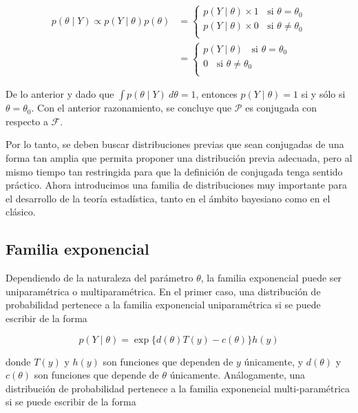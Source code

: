 \documentclass[
  10pt,
  spanish,
]{book}
\theoremstyle{definition}
\theoremstyle{definition}
\theoremstyle{definition}
\theoremstyle{definition}
\theoremstyle{remark}
\begin{document}
\begin{align*}
    p(\theta \mid Y)\propto
    p(Y \mid \theta)p(\theta)
    &=
    \begin{cases}
    p(Y \mid \theta)\times 1 \ \ \ \ \text{si $\theta=\theta_0$}\\
    p(Y \mid \theta)\times 0 \ \ \ \ \text{si $\theta\neq\theta_0$}\\
    \end{cases}\\
    &=
    \begin{cases}
    p(Y \mid \theta) \ \ \ \ \text{si $\theta=\theta_0$}\\
    0           \ \ \ \ \text{si $\theta\neq\theta_0$}\\
    \end{cases}
\end{align*}

De lo anterior y dado que \(\int p(\theta \mid Y)\ d\theta=1\), entonces
\(p(Y \mid \theta)=1\) si y sólo si \(\theta=\theta_0\). Con el anterior
razonamiento, se concluye que \(\mathcal{P}\) es conjugada con respecto a
\(\mathcal{F}\).

Por lo tanto, se deben buscar distribuciones previas que sean
conjugadas de una forma tan amplia que permita proponer una distribución
previa adecuada, pero al mismo tiempo tan restringida para que la
definición de conjugada tenga sentido práctico. Ahora introducimos una
familia de distribuciones muy importante para el desarrollo de la teoría
estadística, tanto en el ámbito bayesiano como en el clásico.

\hypertarget{familia-exponencial}{%
\subsection{Familia exponencial}\label{familia-exponencial}}

Dependiendo de la naturaleza del parámetro \(\theta\), la familia
exponencial puede ser uniparamétrica o multiparamétrica. En el primer
caso, una distribución de probabilidad pertenece a la familia
exponencial uniparamétrica si se puede escribir de la forma

\begin{equation}
\label{eq:uniexpo}
p(Y \mid \theta)=\exp\{d(\theta)T(y)-c(\theta)\}h(y)
\end{equation}

donde \(T(y)\) y \(h(y)\) son funciones que dependen de \(y\) únicamente, y
\(d(\theta)\) y \(c(\theta)\) son funciones que depende de \(\theta\)
únicamente. Análogamente, una distribución de probabilidad pertenece a
la familia exponencial multi-paramétrica si se puede escribir de la
forma
\end{document}
